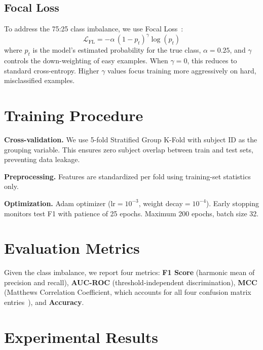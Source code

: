 \documentclass[11pt,a4paper]{article}
\begin{document}
\subsection{Focal Loss}

To address the 75:25 class imbalance, we use Focal Loss~\cite{lin2017focal}:
\begin{equation}
    \mathcal{L}_{\mathrm{FL}} = -\alpha\,(1 - p_t)^\gamma \log(p_t)
\end{equation}
where $p_t$ is the model's estimated probability for the true class,
$\alpha=0.25$, and $\gamma$ controls the down-weighting of easy examples. When
$\gamma=0$, this reduces to standard cross-entropy. Higher $\gamma$ values
focus training more aggressively on hard, misclassified examples.


\section{Training Procedure}

\textbf{Cross-validation.} We use 5-fold Stratified Group K-Fold with subject
ID as the grouping variable. This ensures zero subject overlap between train
and test sets, preventing data leakage.

\textbf{Preprocessing.} Features are standardized per fold using training-set
statistics only.

\textbf{Optimization.} Adam optimizer (lr$=10^{-3}$, weight decay$=10^{-4}$).
Early stopping monitors test F1 with patience of 25 epochs. Maximum 200 epochs, batch size 32.


\section{Evaluation Metrics}

Given the class imbalance, we report four metrics:
\textbf{F1 Score} (harmonic mean of precision and recall),
\textbf{AUC-ROC} (threshold-independent discrimination),
\textbf{MCC} (Matthews Correlation Coefficient, which accounts for all four
confusion matrix entries~\cite{chicco2020advantages}), and
\textbf{Accuracy}.


\section{Experimental Results}
\end{document}
